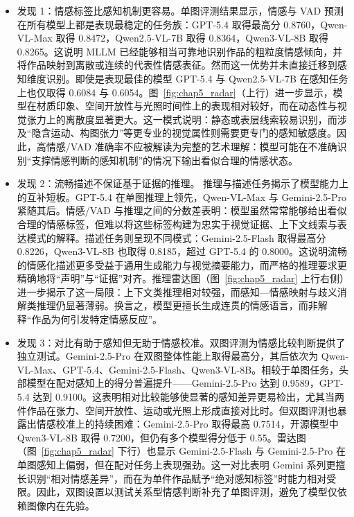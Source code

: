 \begin{itemize}
\item 发现 1：情感标签比感知机制更容易。单图评测结果显示，情感与 VAD 预测在所有模型上都是表现最稳定的任务族：GPT-5.4 取得最高分 0.8760，Qwen-VL-Max 取得 0.8472，Qwen2.5-VL-7B 取得 0.8364，Qwen3-VL-8B 取得 0.8265。这说明 MLLM 已经能够相当可靠地识别作品的粗粒度情感倾向，并将作品映射到离散或连续的代表性情感表征。然而这一优势并未直接迁移到感知维度识别。即使是表现最佳的模型 GPT-5.4 与 Qwen2.5-VL-7B 在感知任务上也仅取得 0.6084 与 0.6054。图~\ref{fig:chap5_radar}（上行）进一步显示，模型在材质印象、空间开放性与光照时间性上的表现相对较好，而在动态性与视觉张力上的离散度显著更大。这一模式说明：静态或表层线索较易识别，而涉及“隐含运动、构图张力”等更专业的视觉属性则需要更专门的感知敏感度。因此，高情感/VAD 准确率不应被解读为完整的艺术理解：模型可能在不准确识别“支撑情感判断的感知机制”的情况下输出看似合理的情感状态。

\item 发现 2：流畅描述不保证基于证据的推理。 推理与描述任务揭示了模型能力上的互补短板。GPT-5.4 在单图推理上领先，Qwen-VL-Max 与 Gemini-2.5-Pro 紧随其后。情感/VAD 与推理之间的分数差表明：模型虽然常常能够给出看似合理的情感标签，但难以将这些标签构建为忠实于视觉证据、上下文线索与表达模式的解释。描述任务则呈现不同模式：Gemini-2.5-Flash 取得最高分 0.8226，Qwen3-VL-8B 也取得 0.8185，超过 GPT-5.4 的 0.8000。这说明流畅的情感化描述更多受益于通用生成能力与视觉摘要能力，而严格的推理要求更精确地将“声明”与“证据”对齐。推理雷达图（图~\ref{fig:chap5_radar} 上行右侧）进一步揭示了这一局限：上下文类推理相对较强，而感知—情感映射与歧义消解类推理仍显著薄弱。换言之，模型更擅长生成连贯的情感语言，而非解释“作品为何引发特定情感反应”。

\item 发现 3：对比有助于感知但无助于情感校准。双图评测为情感比较判断提供了独立测试。Gemini-2.5-Pro 在双图整体性能上取得最高分，其后依次为 Qwen-VL-Max、GPT-5.4、Gemini-2.5-Flash、Qwen3-VL-8B。相较于单图任务，头部模型在配对感知上的得分普遍提升——Gemini-2.5-Pro 达到 0.9589，GPT-5.4 达到 0.9100。这表明相对比较能够使显著的感知差异更易检出，尤其当两件作品在张力、空间开放性、运动或光照上形成直接对比时。但双图评测也暴露出情感校准上的持续困难：Gemini-2.5-Pro 取得最高 0.7514，开源模型中 Qwen3-VL-8B 取得 0.7200，但仍有多个模型得分低于 0.55。雷达图（图~\ref{fig:chap5_radar} 下行）也显示 Gemini-2.5-Flash 与 Gemini-2.5-Pro 在单图感知上偏弱，但在配对任务上表现强劲。这一对比表明 Gemini 系列更擅长识别“相对情感差异”，而在为单件作品赋予“绝对感知标签”时能力相对受限。因此，双图设置以测试关系型情感判断补充了单图评测，避免了模型仅依赖图像内在先验。


\end{itemize}
